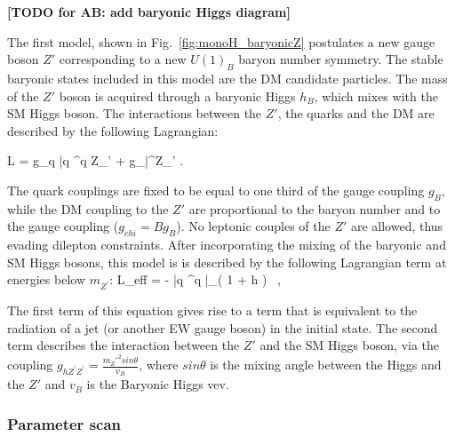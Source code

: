 \textbf{[TODO for AB: add baryonic Higgs diagram]}

The first model, shown in Fig.~\ref{fig:monoH_baryonicZ} 
postulates a new gauge boson $Z'$ corresponding to a new $U(1)_B$ baryon 
number symmetry. The stable baryonic states included in this model are the DM candidate particles.
The mass of the $Z'$ boson is acquired through a baryonic Higgs $h_B$, which mixes with the 
SM Higgs boson. The interactions between the $Z'$, the quarks and the DM are described by 
the following Lagrangian:   

\be \label{ZprimeDM}
	L =  g_q  \bar q \gamma^\mu q  Z_\mu' +
%
	 g_\chi  \bar\chi \gamma^\mu \chi Z_\mu' .
\ee

The quark couplings \gq are fixed to be equal to one third of the gauge coupling $g_B$, 
while the DM coupling to the $Z'$ are proportional to the baryon number and to the gauge coupling 
($g_{chi} = B g_B$). No leptonic couples of the $Z'$ are allowed, thus evading dilepton constraints. 
After incorporating the mixing of the baryonic and SM Higgs bosons, this model is 
is described by the following Lagrangian term at energies below $m_{Z^\prime}$: 
 \be \label{U1Beft}
 L_{\rm eff} = -  \bar{q} \gamma^\mu q \bar\chi \gamma_\mu \chi \Big( 1 +  h \Big) \, ,
 \ee

The first term of this equation gives rise to a term that is equivalent to the 
radiation of a jet (or another EW gauge boson) in the initial state. 
The second term describes the interaction between the $Z'$ and the SM Higgs boson,
via the coupling $g_{h Z^\prime Z^\prime} = \frac{m_Z'^2 sin\theta}{v_B}$, where
$sin\theta$ is the mixing angle between the Higgs and the $Z'$ and $v_B$ is the
Baryonic Higgs vev. 


\subsubsection{Parameter scan} 

